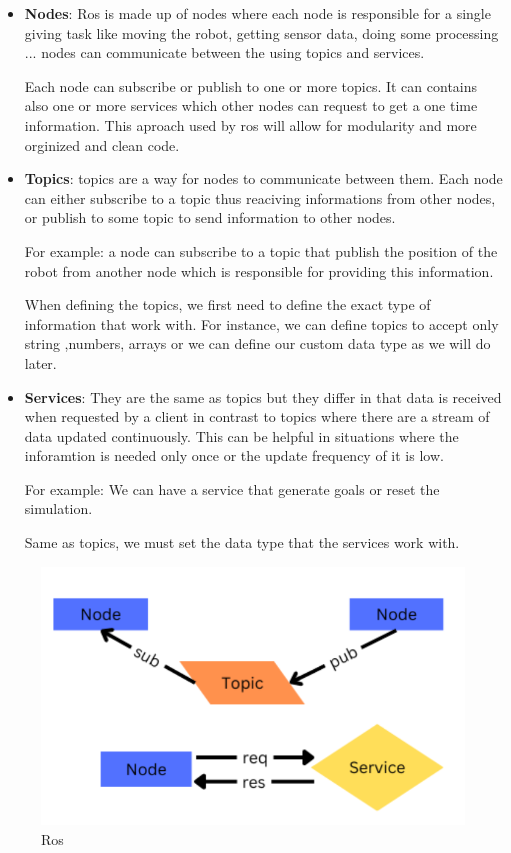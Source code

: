 \documentclass[12pt]{extarticle}
\begin{document}
 

\begin{itemize}
\item \textbf{Nodes}: Ros is made up of nodes where  each node     is responsible for a single giving task like moving the robot, getting sensor data, doing some processing ... \linebreak
nodes can communicate between the using topics and services.

Each node can subscribe or publish  to one or more topics. It can contains also one or more services which other nodes can request to get a one time information. This aproach used by ros will allow for modularity and more orginized and clean code.

     



\item \textbf{Topics}: topics are a way for nodes to communicate between them. Each node can either subscribe to a topic thus reaciving informations from other nodes, or publish to some topic to send information to other nodes.

For example: a node can subscribe to a topic that publish the position of the robot  from another node which is responsible for providing this information.

When defining the topics, we first need to define the exact type of information that work with. For instance, we can define topics to accept only string ,numbers, arrays or we can define our custom data type as we will do later.


\item \textbf{Services}:  They are the same as topics but they differ in that data is received when requested by a client in contrast to topics where there are a stream of data updated continuously. This can be helpful in situations where the inforamtion is needed only once or the update frequency of it is low.
 


For example: We can have a service that generate goals or reset the simulation.

Same as topics, we  must set the data type that the services work with.


\end{itemize}
 

 
 \begin{figure}[h]  
\centering
\includegraphics[scale=0.4]{ros}
\caption[Ros]{Ros}
\end{figure}
\pagebreak
\end{document}
